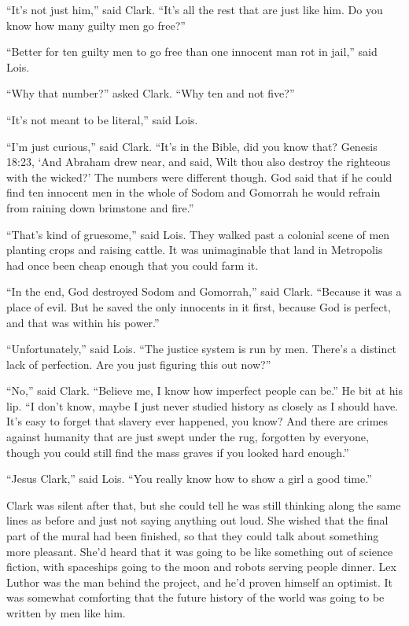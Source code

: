 \documentclass[ebook,12pt]{memoir}
\begin{document}
``It's not just him,'' said Clark. ``It's all the rest that are just
like him. Do you know how many guilty men go free?''

``Better for ten guilty men to go free than one innocent man rot in
jail,'' said Lois.

``Why that number?'' asked Clark. ``Why ten and not five?''

``It's not meant to be literal,'' said Lois.

``I'm just curious,'' said Clark. ``It's in the Bible, did you know
that? Genesis 18:23, `And Abraham drew near, and said, Wilt thou also
destroy the righteous with the wicked?' The numbers were different
though. God said that if he could find ten innocent men in the whole of
Sodom and Gomorrah he would refrain from raining down brimstone and
fire.''

``That's kind of gruesome,'' said Lois. They walked past a colonial
scene of men planting crops and raising cattle. It was unimaginable that
land in Metropolis had once been cheap enough that you could farm it.

``In the end, God destroyed Sodom and Gomorrah,'' said Clark. ``Because
it was a place of evil. But he saved the only innocents in it first,
because God is perfect, and that was within his power.''

``Unfortunately,'' said Lois. ``The justice system is run by men.
There's a distinct lack of perfection. Are you just figuring this out
now?''

``No,'' said Clark. ``Believe me, I know how imperfect people can be.''
He bit at his lip. ``I don't know, maybe I just never studied history as
closely as I should have. It's easy to forget that slavery ever
happened, you know? And there are crimes against humanity that are just
swept under the rug, forgotten by everyone, though you could still find
the mass graves if you looked hard enough.''

``Jesus Clark,'' said Lois. ``You really know how to show a girl a good
time.''

Clark was silent after that, but she could tell he was still thinking
along the same lines as before and just not saying anything out loud.
She wished that the final part of the mural had been finished, so that
they could talk about something more pleasant. She'd heard that it was
going to be like something out of science fiction, with spaceships going
to the moon and robots serving people dinner. Lex Luthor was the man
behind the project, and he'd proven himself an optimist. It was somewhat
comforting that the future history of the world was going to be written
by men like him.
\end{document}
